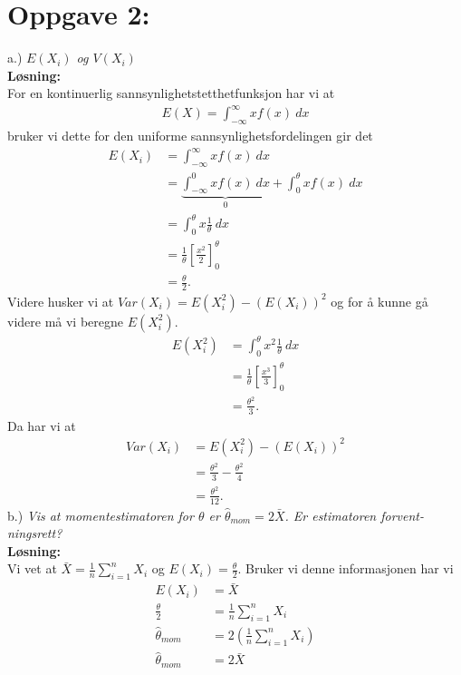 \documentclass[12pt,
               a4paper,
               article,
               oneside,
               oldfontcommands,
               norsk]{memoir}
\begin{document}
\section*{Oppgave 2:}
a.) \emph{$E(X_i)$ og $V(X_i)$}
\vspace{3mm}\\
\textbf{Løsning:}\vspace{3mm}\\
For en kontinuerlig sannsynlighetstetthetfunksjon har vi at 
\begin{align*}
    E(X) = \int_{-\infty}^{\infty} xf(x) \ dx 
\end{align*}
bruker vi dette for den uniforme sannsynlighetsfordelingen gir det 
\begin{align*}
    E(X_i) &= \int_{-\infty}^{\infty} xf(x) \ dx \\[7pt]
    &= \underbrace{\int_{-\infty}^{0} xf(x) \ dx}_{ 0} + \int_{0}^{\theta} xf(x) \ dx \\[7pt]
    &= \int_{0}^{\theta} x \frac{1}{\theta} \ dx \\[7pt]
    &=  \frac{1}{\theta} \left[ {\frac{x^2}{2}}\right]_{0}^{\theta} \\[7pt]
    &= \frac{\theta}{2}.
\end{align*}
Videre husker vi at $Var(X_i) = E(X_i^2) - (E(X_i))^2$ og for å kunne gå videre må vi beregne $E(X_i^2)$. 
\begin{align*}
    E(X_{i}^2) &= \int_{0}^{\theta} x^2 \frac{1}{\theta} \ dx \\[7pt]
    &= \frac{1}{\theta} \left[ {\frac{x^3}{3}}\right]_{0}^{\theta} \\[7pt]
    &= \frac{\theta^2}{3}.
\end{align*}
Da har vi at 
\begin{align*}
Var(X_i) &= E(X_i^2) - (E(X_i))^2 \\[7pt]
&= \frac{\theta^2}{3} - \frac{\theta^2}{4}\\[7pt]
&=\frac{\theta^2}{12}.
\end{align*}
b.) \emph{Vis at momentestimatoren for $\theta$ er $\hat{\theta}_{mom} = 2\bar{X}$. Er estimatoren forvent-
ningsrett?}
\vspace{3mm}\\
\textbf{Løsning:}\vspace{3mm}\\
Vi vet at $\bar{X} = \frac{1}{n} \sum_{i=1}^{n} X_i$ og $E(X_i) = \frac{\theta}{2}$. Bruker vi denne informasjonen har vi
\begin{align*}
    E(X_i) &= \bar{X} \\[7pt]
    \frac{\theta}{2} &= \frac{1}{n} \sum_{i=1}^{n} X_i \\[7pt]
    \hat{\theta}_{mom} & = 2 \left(\frac{1}{n} \sum_{i=1}^{n} X_i \right) \\[7pt]
    \hat{\theta}_{mom} &= 2 \bar{X}
\end{align*}
\end{document}
